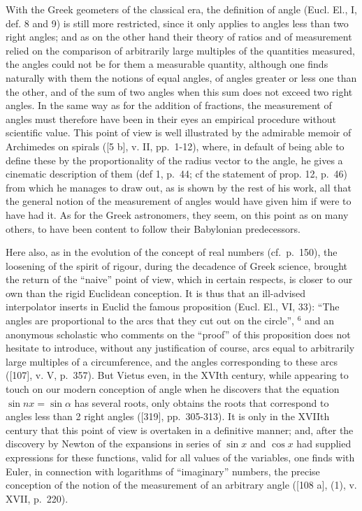 With the Greek geometers of the classical era, the definition of angle (Eucl. El., I, def. 8 and 9) is still more restricted, since it only applies to angles less than two right angles; and as on the other hand their theory of ratios and of measurement relied on the comparison of arbitrarily large multiples of the quantities measured, the angles could not be for them a measurable quantity, although one finds naturally with them the notions of equal angles, of angles greater or less one than the other, and of the sum of two angles when this sum does not exceed two right angles. In the same way as for the addition of fractions, the measurement of angles must therefore have been in their eyes an empirical procedure without scientific value. This point of view is well illustrated by the admirable memoir of Archimedes on spirals ({[}5 b{]}, v. II, pp.~1-12), where, in default of being able to define these by the proportionality of the radius vector to the angle, he gives a cinematic description of them (def 1, p.~44; cf the statement of prop. 12, p.~46) from which he manages to draw out, as is shown by the rest of his work, all that the general notion of the measurement of angles would have given him if were to have had it. As for the Greek astronomers, they seem, on this point as on many others, to have been content to follow their Babylonian predecessors.

Here also, as in the evolution of the concept of real numbers (cf.~p.~150), the loosening of the spirit of rigour, during the decadence of Greek science, brought the return of the ``naive'' point of view, which in certain respects, is closer to our own than the rigid Euclidean conception. It is thus that an ill-advised interpolator inserts in Euclid the famous proposition (Eucl. El., VI, 33): ``The angles are proportional to the arcs that they cut out on the circle'', \(^{6}\) and an anonymous scholastic who comments on the ``proof'' of this proposition does not hesitate to introduce, without any justification of course, arcs equal to arbitrarily large multiples of a circumference, and the angles corresponding to these arcs ({[}107{]}, v. V, p.~357). But Vietus even, in the XVIth century, while appearing to touch on our modern conception of angle when he discovers that the equation \(\sin nx = \sin \alpha\) has several roots, only obtains the roots that correspond to angles less than 2 right angles ({[}319{]}, pp.~305-313). It is only in the XVIIth century that this point of view is overtaken in a definitive manner; and, after the discovery by Newton of the expansions in series of \(\sin x\) and \(\cos x\) had supplied expressions for these functions, valid for all values of the variables, one finds with Euler, in connection with logarithms of ``imaginary'' numbers, the precise conception of the notion of the measurement of an arbitrary angle ({[}108 a{]}, (1), v. XVII, p.~220).

